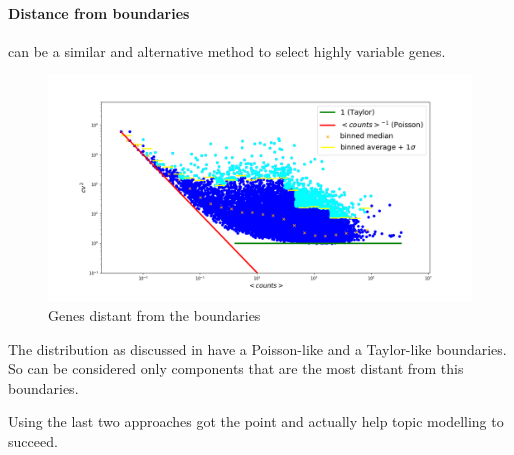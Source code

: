 \paragraph{Distance from boundaries} can be a similar and alternative method to select highly variable genes.
\begin{figure}[htb!]
    \centering
    \includegraphics[width=0.8\linewidth]{pictures/topic/cvmean_oversigma.png}
    \caption{Genes distant from the boundaries}
    \label{fig:topic/cvmean_oversampling}
\end{figure}
The distribution as discussed in  have a Poisson-like and a Taylor-like boundaries. So can be considered only components that are the most distant from this boundaries.

Using the last two approaches got the point and actually help topic modelling to succeed.